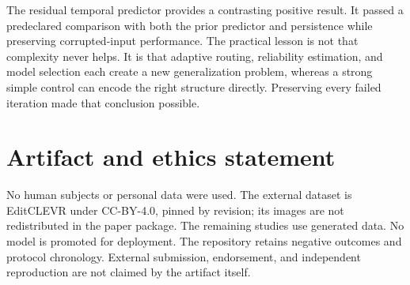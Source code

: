 \documentclass[10pt]{article}
\begin{document}
The residual temporal predictor provides a contrasting positive result. It passed a
predeclared comparison with both the prior predictor and persistence while preserving
corrupted-input performance. The practical lesson is not that complexity never helps. It
is that adaptive routing, reliability estimation, and model selection each create a new
generalization problem, whereas a strong simple control can encode the right structure
directly. Preserving every failed iteration made that conclusion possible.

\section*{Artifact and ethics statement}
No human subjects or personal data were used. The external dataset is EditCLEVR under
CC-BY-4.0, pinned by revision; its images are not redistributed in the paper package. The
remaining studies use generated data. No model is promoted for deployment. The repository
retains negative outcomes and protocol chronology. External submission, endorsement, and
independent reproduction are not claimed by the artifact itself.



\end{document}
